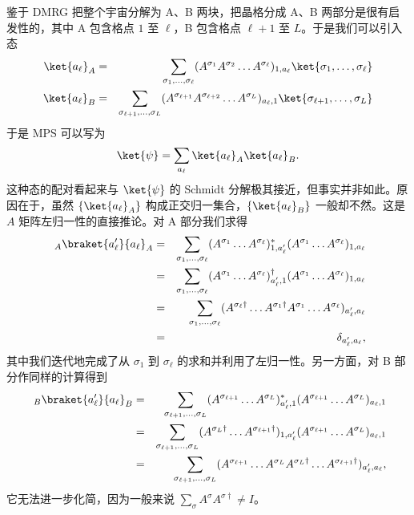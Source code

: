 鉴于 DMRG 把整个宇宙分解为 A、B 两块，把晶格分成 A、B 两部分是很有启发性的，其中 A 包含格点 $1$ 至 $\ell$，B 包含格点 $\ell+1$ 至 $L$。于是我们可以引入态
\begin{eqnarray}
\ket{a_\ell}_A &=& \sum_{\sigma_1,\ldots,\sigma_\ell} (A^{\sigma_1} A^{\sigma_2} \ldots A^{\sigma_\ell})_{1,a_\ell} \ket{\sigma_1,\ldots,\sigma_\ell} \\
\ket{a_\ell}_B &=& \sum_{\sigma_{\ell+1},\ldots,\sigma_L} (A^{\sigma_{\ell+1}} A^{\sigma_{\ell+2}} \ldots A^{\sigma_L})_{a_\ell,1} \ket{\sigma_{\ell+1},\ldots,\sigma_L}
\end{eqnarray}
于是 MPS 可以写为
\begin{equation}
\ket{\psi} = \sum_{a_\ell} \ket{a_\ell}_A \ket{a_\ell}_B . 
\end{equation}
这种态的配对看起来与 $\ket{\psi}$ 的 Schmidt 分解极其接近，但事实并非如此。原因在于，虽然 $\{ \ket{a_\ell}_A \}$ 构成正交归一集合，$\{ \ket{a_\ell}_B \}$ 一般却不然。这是 $A$ 矩阵左归一性的直接推论。对 A 部分我们求得 
\begin{eqnarray*}
\phantom\langle_A \braket{a'_\ell}{a_\ell}_A &=& \sum_{\sigma_1,\ldots,\sigma_\ell} (A^{\sigma_1} \ldots A^{\sigma_\ell})^*_{1,a'_\ell} (A^{\sigma_1} \ldots A^{\sigma_\ell})_{1,a_\ell} \\
&=& \sum_{\sigma_1,\ldots,\sigma_\ell} (A^{\sigma_1} \ldots A^{\sigma_\ell})^\dagger_{a'_\ell,1} (A^{\sigma_1} \ldots A^{\sigma_\ell})_{1,a_\ell} \\
&=& \sum_{\sigma_1,\ldots,\sigma_\ell} (A^{\sigma_\ell\dagger} \ldots A^{\sigma_1\dagger}A^{\sigma_1} \ldots A^{\sigma_\ell})_{a'_\ell,a_\ell} \\
&=& \delta_{a'_\ell,a_\ell} ,
\end{eqnarray*}
其中我们迭代地完成了从 $\sigma_1$ 到 $\sigma_\ell$ 的求和并利用了左归一性。另一方面，对 B 部分作同样的计算得到
\begin{eqnarray*}
\phantom\langle_B \braket{a'_\ell}{a_\ell}_B &=& \sum_{\sigma_{\ell+1},\ldots,\sigma_L} (A^{\sigma_{\ell+1}} \ldots A^{\sigma_L})^*_{a'_\ell,1} (A^{\sigma_{\ell+1}} \ldots A^{\sigma_L})_{a_\ell,1} \\
&=& \sum_{\sigma_{\ell+1},\ldots,\sigma_L} (A^{\sigma_L\dagger} \ldots A^{\sigma_{\ell+1}\dagger})_{1,a'_\ell} (A^{\sigma_{\ell+1}} \ldots A^{\sigma_L})_{a_\ell,1} \\
&=& \sum_{\sigma_{\ell+1},\ldots,\sigma_L} (A^{\sigma_{\ell+1}} \ldots A^{\sigma_L}A^{\sigma_L\dagger} \ldots A^{\sigma_{\ell+1}\dagger})_{a'_\ell,a_\ell},
\end{eqnarray*}
它无法进一步化简，因为一般来说 $\sum_\sigma A^\sigma A^{\sigma\dagger} \neq I$。

